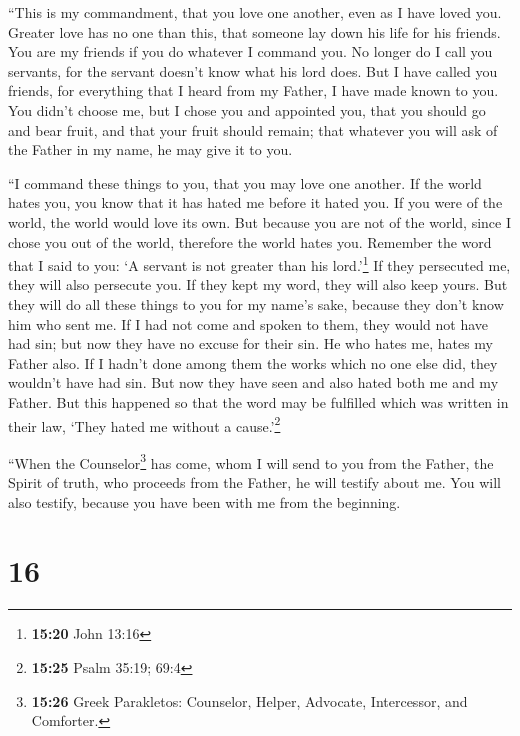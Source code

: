 ``This is my commandment, that you love one another,
even as I have loved you.  Greater love has no one than
this, that someone lay down his life for his friends. 
You are my friends if you do whatever I command you.  No
longer do I call you servants, for the servant doesn't know what his
lord does. But I have called you friends, for everything that I heard
from my Father, I have made known to you.  You didn't
choose me, but I chose you and appointed you, that you should go and
bear fruit, and that your fruit should remain; that whatever you will
ask of the Father in my name, he may give it to you.

 ``I command these things to you, that you may love one
another.  If the world hates you, you know that it has
hated me before it hated you.  If you were of the world,
the world would love its own. But because you are not of the world,
since I chose you out of the world, therefore the world hates you.
 Remember the word that I said to you: `A servant is not
greater than his lord.'\footnote{\textbf{15:20} John 13:16} If they
persecuted me, they will also persecute you. If they kept my word, they
will also keep yours.  But they will do all these things
to you for my name's sake, because they don't know him who sent me.
 If I had not come and spoken to them, they would not
have had sin; but now they have no excuse for their sin. 
He who hates me, hates my Father also.  If I hadn't done
among them the works which no one else did, they wouldn't have had sin.
But now they have seen and also hated both me and my Father.
 But this happened so that the word may be fulfilled
which was written in their law, `They hated me without a
cause.'\footnote{\textbf{15:25} Psalm 35:19; 69:4}

 ``When the Counselor\footnote{\textbf{15:26} Greek
  Parakletos: Counselor, Helper, Advocate, Intercessor, and Comforter.}
has come, whom I will send to you from the Father, the Spirit of truth,
who proceeds from the Father, he will testify about me. 
You will also testify, because you have been with me from the beginning.

\hypertarget{section-15}{%
\section{16}\label{section-15}}

